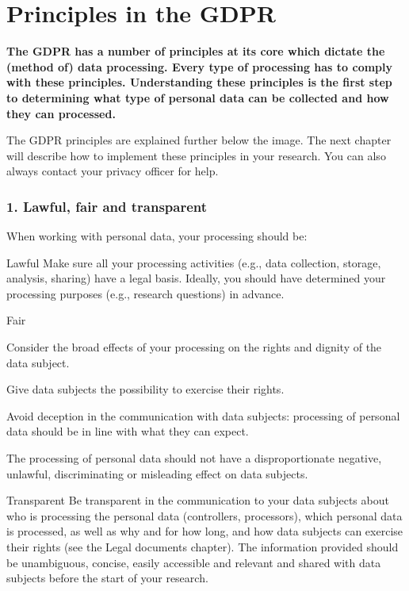 \documentclass[
]{book}
\begin{document}
\hypertarget{gdpr-principles}{%
\section{Principles in the GDPR}\label{gdpr-principles}}

\textbf{The GDPR has a number of principles at its core which dictate the (method of)
data processing. Every type of processing has to comply with these principles.
Understanding these principles is the first step to determining what type of
personal data can be collected and how they can processed.}

The GDPR principles are explained further below the image. The
next chapter will describe how to implement these
principles in your research. You can also always contact your
privacy officer for help.

\hypertarget{lawful-fair-and-transparent}{%
\subsubsection{1. Lawful, fair and transparent}\label{lawful-fair-and-transparent}}

When working with personal data, your processing should be:

Lawful
Make sure all your processing activities (e.g., data collection, storage,
analysis, sharing) have a legal basis. Ideally,
you should have determined your processing purposes (e.g., research questions)
in advance.

Fair

Consider the broad effects of your processing on the rights and dignity
of the data subject.

Give data subjects the possibility to exercise
their rights.

Avoid deception in the communication with data subjects: processing of
personal data should be in line with what they can expect.

The processing of personal data should not have a disproportionate
negative, unlawful, discriminating or misleading effect on data subjects.

Transparent
Be transparent in the communication to your data subjects about who is
processing the personal data (controllers, processors), which personal data is
processed, as well as why and for how long, and how data subjects can exercise
their rights (see the Legal documents chapter).
The information provided should be unambiguous, concise, easily accessible and
relevant and shared with data subjects before the start of your research.
\end{document}
